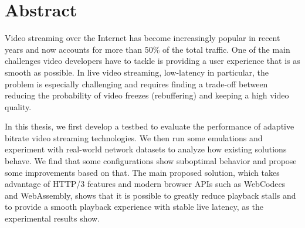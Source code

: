 \chapter*{Abstract} %
\label{abtract}


Video streaming over the Internet has become increasingly popular in recent years and now accounts for more than 50\% of the total traffic. One of the main challenges video developers have to tackle is providing a user experience that is as smooth as possible. In live video streaming, low-latency in particular, the problem is especially challenging and requires finding a trade-off between reducing the probability of video freezes (rebuffering) and keeping a high video quality.

In this thesis, we first develop a testbed to evaluate the performance of adaptive bitrate video streaming technologies. We then run some emulations and experiment with real-world network datasets to analyze how existing solutions behave. We find that some configurations show suboptimal behavior and propose some improvements based on that. The main proposed solution, which takes advantage of HTTP/3 features and modern browser APIs such as WebCodecs and WebAssembly, shows that it is possible to greatly reduce playback stalls and to provide a smooth playback experience with stable live latency, as the experimental results show.

\newpage
